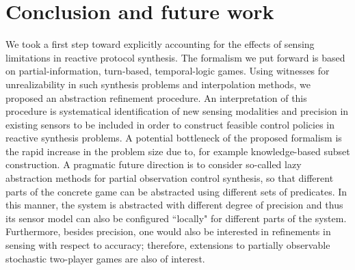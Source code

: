 \documentclass[letterpaper, 10 pt, conference]{ieeeconf}
\begin{document}
\section{Conclusion and future work}
\label{sec:conclusion}

We took a first step toward explicitly accounting for the effects of
sensing limitations in reactive protocol synthesis. The formalism we
put forward is based on partial-information, turn-based,
temporal-logic games. Using witnesses for unrealizability in such
synthesis problems and interpolation methods, we proposed an
abstraction refinement procedure. An interpretation of this procedure
is systematical identification of new sensing modalities and precision
in existing sensors to be included in order to construct feasible
control policies in reactive synthesis problems.  A potential
bottleneck of the proposed formalism is the rapid increase in the
problem size due to, for example knowledge-based subset
construction. A pragmatic future direction is to consider so-called
lazy abstraction methods \cite{henzinger2002lazy} for partial
observation control synthesis, so that different parts of the concrete
game can be abstracted using different sets of predicates. In this
manner, the system is abstracted with different degree of precision
and thus its sensor model can also be configured ``locally" for
different parts of the system.  Furthermore, besides precision, one
would also be interested in refinements in sensing with respect to
accuracy; therefore, extensions to partially observable stochastic
two-player games are also of interest.



\end{document}
